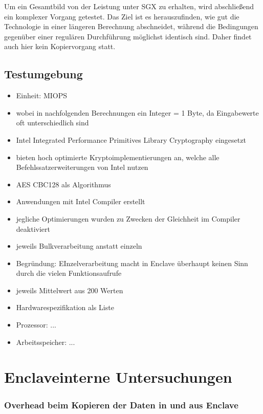 Um ein Gesamtbild von der Leistung unter SGX zu erhalten, wird abschließend ein komplexer Vorgang getestet. Das Ziel ist es herauszufinden, wie gut die Technologie in einer längeren Berechnung abschneidet, während die Bedingungen gegenüber einer regulären Durchführung möglichst identisch sind. Daher findet auch hier kein Kopiervorgang statt.
\subsection{Testumgebung}
\begin{itemize}
	\item Einheit: MIOPS
	\item wobei in nachfolgenden Berechnungen ein Integer = 1 Byte, da Eingabewerte oft unterschiedlich sind
	\item Intel Integrated Performance Primitives Library Cryptography eingesetzt
	\item bieten hoch optimierte Kryptoimplementierungen an, welche alle Befehlssatzerweiterungen von Intel nutzen
	\item AES CBC128 als Algorithmus
	\item Anwendungen mit Intel Compiler erstellt
	\item jegliche Optimierungen wurden zu Zwecken der Gleichheit im Compiler deaktiviert
	\item jeweils Bulkverarbeitung anstatt einzeln
	\item Begründung: EInzelverarbeitung macht in Enclave überhaupt keinen Sinn durch die vielen Funktionsaufrufe
	\item jeweils Mittelwert aus 200 Werten
	\item Hardwarespezifikation als Liste
	\item Prozessor: ...
	\item Arbeitsspeicher: ...
\end{itemize}

\section{Enclaveinterne Untersuchungen}
\subsubsection{Overhead beim Kopieren der Daten in und aus Enclave}

